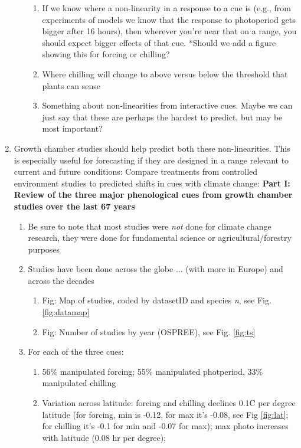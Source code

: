 \documentclass[11pt,letterpaper]{article}
\begin{document}
\begin{enumerate}
\begin{enumerate}
\begin{enumerate}
\item If we know where a non-linearity in a response to a cue is (e.g., from experiments of models we know that the response to photoperiod gets bigger after 16 hours), then wherever you're near that on a range, you should expect bigger effects of that cue. *Should we add a figure showing this for forcing or chilling? %
\item Where chilling will change to above versus below the threshold that plants can sense %
\item Something about non-linearities from interactive cues. Maybe we can just say that these are perhaps the hardest to predict, but may be most important?
\end{enumerate}
\end{enumerate}
\item Growth chamber studies should help predict both these non-linearities. This is especially useful for forecasting if they are designed in a range relevant to current and future conditions: Compare treatments from controlled environment studies to predicted shifts in cues with climate change: {\bf Part I: Review of the three major phenological cues from growth chamber studies over the last 67 years} %
\begin{enumerate}
\item Be sure to note that most studies were \emph{not} done for climate change research, they were done for fundamental science or agricultural/forestry purposes
\item Studies have been done across the globe ... (with more in Europe) and across the decades
\begin{enumerate}
\item Fig: Map of studies, coded by datasetID and species \emph{n},  see Fig. \ref{fig:datamap}
\item Fig: Number of studies by year (OSPREE), see Fig. \ref{fig:ts}
\end{enumerate}
\item For each of the three cues:
\begin{enumerate}
\item  56\% manipulated forcing; 55\% manipulated photperiod, 33\% manipulated chilling
\item Variation across latitude: forcing and chilling declines 0.1C per degree latitude (for forcing, min is -0.12, for max it's -0.08, see Fig \ref{fig:lat}; for chilling it's -0.1 for min and -0.07 for max); max photo increases with latitude (0.08 hr per degree); 

\end{enumerate}
\end{enumerate}
\end{enumerate}
\end{document}
